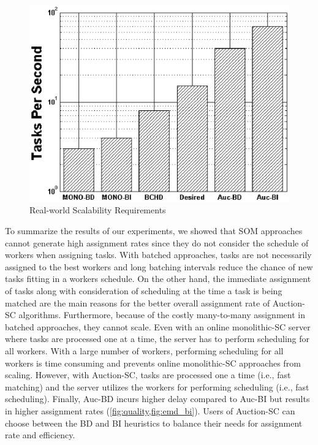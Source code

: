 \begin{figure}[h]
	\centering
	\includegraphics[width = 0.75\columnwidth]{figures/scale_req.eps}
	\vspace{-0.1in}
	\caption{Real-world Scalability Requirements}\label{fig:req}
\end{figure}

To summarize the results of our experiments, we showed that SOM approaches cannot generate high assignment rates since they do not consider the schedule of workers when assigning tasks. With batched approaches, tasks are not necessarily assigned to the best workers and long batching intervals reduce the chance of new tasks fitting in a workers schedule. On the other hand, the immediate assignment of tasks along with consideration of scheduling at the time a task is being matched are the main reasons for the better overall assignment rate of Auction-SC algorithms. Furthermore, because of the costly many-to-many assignment in batched approaches, they cannot scale. Even with an online monolithic-SC server where tasks are processed one at a time, the server has to perform scheduling for all workers. With a large number of workers, performing scheduling for all workers is time consuming and prevents online monolithic-SC approaches from scaling. However, with Auction-SC, tasks are processed one a time (i.e., fast matching) and the server utilizes the workers for performing scheduling (i.e., fast scheduling). Finally, Auc-BD incurs higher delay compared to Auc-BI but results in higher assignment rates (\cref{fig:quality,fig:emd_bi}). Users of Auction-SC can choose between the BD and BI heuristics to balance their needs for assignment rate and efficiency.

